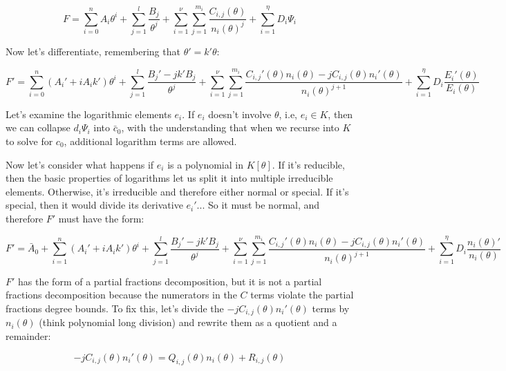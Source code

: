 \begin{comment}
$$F = \sum_{i=0}^n A_i \theta^i + \sum_{i=1}^\mu \sum_{j=1}^{l_i} \frac{B_{ij}(\theta)}{s_i(\theta)^j}
+ \sum_{i=1}^\nu \sum_{j=1}^{m_i} \frac{C_{i,j}(\theta)}{n_i(\theta)^j}
+ \sum_{i=1}^\eta D_i \Psi_i$$

Let's use the fact that $s_1 = \theta$ is the only
special irreducible polynomial:
\end{comment}

$$F = \sum_{i=0}^n A_i \theta^i + \sum_{j=1}^{l} \frac{B_{j}}{\theta^j}
+ \sum_{i=1}^\nu \sum_{j=1}^{m_i} \frac{C_{i,j}(\theta)}{n_i(\theta)^j}
+ \sum_{i=1}^\eta D_i \Psi_i$$

Now let's differentiate, remembering that $\theta' = k'\theta$:

$$F' = \sum_{i=0}^n (A_i' + i A_i k' )\theta^i
  + \sum_{j=1}^{l} \frac{B_{j}' - j k' B_{j}}{\theta^j}
  + \sum_{i=1}^\nu \sum_{j=1}^{m_i} \frac{C_{i,j}'(\theta) n_i(\theta) - j C_{i,j}(\theta) n_i'(\theta) }{n_i(\theta)^{j+1}}
  + \sum_{i=1}^\eta D_i \frac{E_i'(\theta)}{E_i(\theta)}$$

Let's examine the logarithmic elements $e_i$.  If $e_i$ doesn't involve $\theta$, i.e, $e_i \in K$,
then we can collapse $d_i \Psi_i$ into $\bar{c}_0$, with the understanding that when we recurse
into $K$ to solve for $c_0$, additional logarithm terms are allowed.

Now let's consider what happens if $e_i$ is a polynomial in $K[\theta]$.  If it's reducible, then
the basic properties of logarithms let us split it into multiple irreducible elements.
Otherwise, it's irreducible and therefore either normal or special.  If it's special, then it would
divide its derivative $e_i'$... So it must be normal, and therefore $F'$ must have the form:

$$F' = \bar{A}_0 + \sum_{i=1}^n (A_i' + i A_i k' )\theta^i
  + \sum_{j=1}^{l} \frac{B_{j}' - j k' B_{j}}{\theta^j}
  + \sum_{i=1}^\nu \sum_{j=1}^{m_i} \frac{C_{i,j}'(\theta) n_i(\theta) - j C_{i,j}(\theta) n_i'(\theta) }{n_i(\theta)^{j+1}}
  + \sum_{i=1}^\eta D_i \frac{n_i(\theta)'}{n_i(\theta)}$$

$F'$ has the form of a partial fractions decomposition, but it is not
a partial fractions decomposition because the numerators in the $C$
terms violate the partial fractions degree bounds.  To fix this, let's
divide the $-jC_{i,j}(\theta)n_i'(\theta)$ terms by $n_i(\theta)$
(think polynomial long division) and rewrite them as a quotient
and a remainder:

$$-jC_{i,j}(\theta)n_i'(\theta) = Q_{i,j}(\theta) n_i(\theta) + R_{i,j}(\theta)$$

